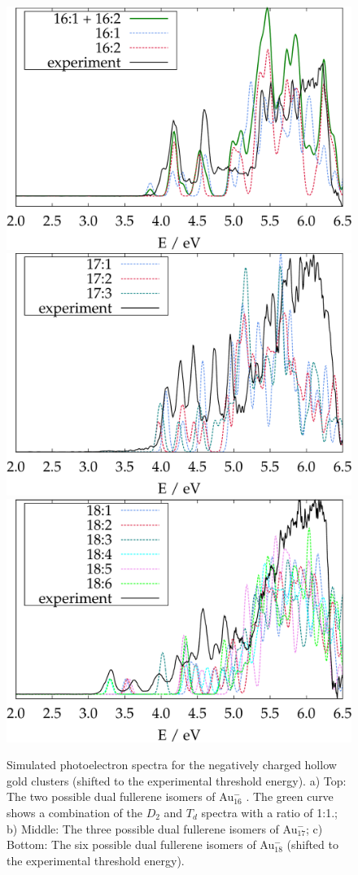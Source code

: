 \begin{figure}[htbp]
\begin{center}
\includegraphics[width=.8\textwidth]{golddual/photo/Au16/turbo/photo1.pdf}\\
\includegraphics[width=.8\textwidth]{golddual/photo/Au17/turbo/compare/compare.pdf}\\
\includegraphics[width=.8\textwidth]{golddual/photo/Au18/turbo/nonrel/compare.pdf}
\caption{Simulated photoelectron spectra for the negatively charged hollow gold clusters 
(shifted to the experimental threshold energy). a) Top: The two possible
dual fullerene isomers of Au$_{16}^-$ . The green curve shows a combination of the $D_2$ and $T_d$ spectra with a ratio of 1:1.; b) Middle: The three possible dual fullerene isomers of Au$_{17}^-$; c) Bottom:
The six possible dual fullerene isomers of Au$_{18}^-$ (shifted to the experimental threshold energy).}
  \label{fig:photo_Au16}
\end{center}
\end{figure}

